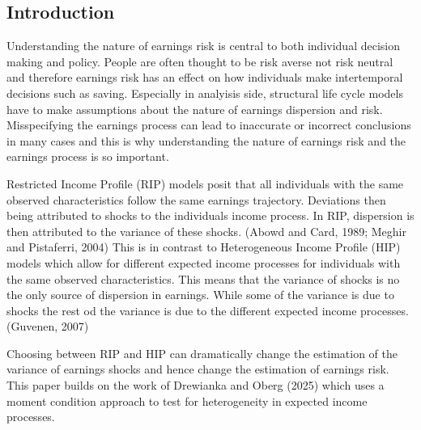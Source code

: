 \documentclass[12pt]{article}
\begin{document}











\begin{onehalfspace}




\section{Introduction}




Understanding the nature of earnings risk is central to both individual decision making and policy. People are often thought to be risk averse not risk neutral and therefore earnings risk has an effect on how individuals make intertemporal decisions such as saving. Especially in analyisis side, structural life cycle models have to make assumptions about the nature of earnings dispersion and risk. Misspecifying the earnings process can lead to inaccurate or incorrect conclusions in many cases and this is why understanding the nature of earnings risk and the earnings process is so important.





Restricted Income Profile (RIP) models posit that all individuals with the same observed characteristics follow the same earnings trajectory. Deviations then being attributed to shocks to the individuals income process. In RIP, dispersion is then attributed to the variance of these shocks. (Abowd and Card, 1989; Meghir and Pistaferri, 2004) This is in contrast to Heterogeneous Income Profile (HIP) models which allow for different expected income processes for individuals with the same observed characteristics. This means that the variance of shocks is no the only source of dispersion in earnings. While some of the variance is due to shocks the rest od the variance is due to the different expected income processes. (Guvenen, 2007) 

Choosing between RIP and HIP can dramatically change the estimation of the variance of earnings shocks and hence change the estimation of earnings risk. This paper builds on the work of Drewianka and Oberg (2025) \cite{drewianka2025} which uses a moment condition approach to test for heterogeneity in expected income processes.



\end{onehalfspace}
\end{document}
